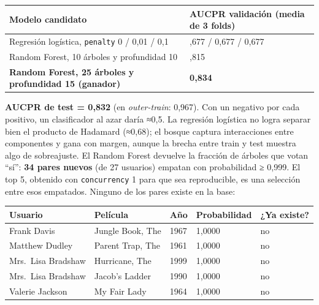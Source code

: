 \documentclass[
  spanish,
  10pt,
]{article}
\newcounter{none} %
\begin{document}
{\def\LTcaptype{none} %
\begin{longtable}[]{@{}
  >{\raggedright\arraybackslash}p{}
  >{\raggedright\arraybackslash}p{}@{}}
\toprule\noalign{}
\begin{minipage}[b]{\linewidth}\raggedright
Modelo candidato
\end{minipage} & \begin{minipage}[b]{\linewidth}\raggedright
AUCPR validación (media de 3 folds)
\end{minipage} \\
\midrule\noalign{}
\endhead
\bottomrule\noalign{}
\endlastfoot
Regresión logística, \texttt{penalty} 0 / 0,01 / 0,1 & 0,677 / 0,677 /
0,677 \\
Random Forest, 10 árboles y profundidad 10 & 0,815 \\
\textbf{Random Forest, 25 árboles y profundidad 15 (ganador)} &
\textbf{0,834} \\
\end{longtable}
}

\textbf{AUCPR de test = 0,832} (en \emph{outer-train}: 0,967). Con un
negativo por cada positivo, un clasificador al azar daría ≈0,5. La
regresión logística no logra separar bien el producto de Hadamard
(≈0,68); el bosque captura interacciones entre componentes y gana con
margen, aunque la brecha entre train y test muestra algo de sobreajuste.
El Random Forest devuelve la fracción de árboles que votan ``sí'':
\textbf{34 pares nuevos} (de 27 usuarios) empatan con probabilidad ≥
0,999. El top 5, obtenido con \texttt{concurrency} 1 para que sea
reproducible, es una selección entre esos empatados. Ninguno de los
pares existe en la base:

{\def\LTcaptype{none} %
\begin{longtable}[]{@{}lllll@{}}
\toprule\noalign{}
Usuario & Película & Año & Probabilidad & ¿Ya existe? \\
\midrule\noalign{}
\endhead
\bottomrule\noalign{}
\endlastfoot
Frank Davis & Jungle Book, The & 1967 & 1,0000 & no \\
Matthew Dudley & Parent Trap, The & 1961 & 1,0000 & no \\
Mrs.~Lisa Bradshaw & Hurricane, The & 1999 & 1,0000 & no \\
Mrs.~Lisa Bradshaw & Jacob's Ladder & 1990 & 1,0000 & no \\
Valerie Jackson & My Fair Lady & 1964 & 1,0000 & no \\
\end{longtable}
}
\end{document}
